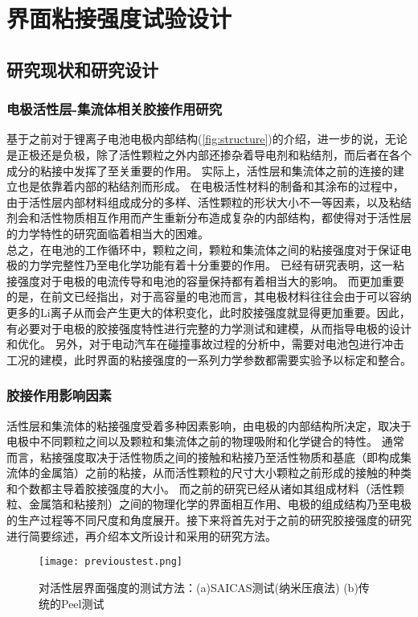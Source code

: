 \chapter{界面粘接强度试验设计}
\section{研究现状和研究设计}
\subsection{电极活性层-集流体相关胶接作用研究}
基于之前对于锂离子电池电极内部结构(\ref{fig:structure})的介绍，进一步的说，无论是正极还是负极，除了活性颗粒之外内部还掺杂着导电剂和粘结剂，而后者在各个成分的粘接中发挥了至关重要的作用。 实际上，活性层和集流体之前的连接的建立也是依靠着内部的粘结剂而形成\cite{Haselrieder2015Measuring}。
在电极活性材料的制备和其涂布的过程中，由于活性层内部材料组成成分的多样、活性颗粒的形状大小不一等因素，以及粘结剂会和活性物质相互作用\cite{Liu2012Particles}而产生重新分布造成复杂的内部结构\cite{Lee2007A,Stevenson2008The}，都使得对于活性层的力学特性的研究面临着相当大的困难\cite{Yoo2003Effect}。\\
\indent 总之，在电池的工作循环中，颗粒之间，颗粒和集流体之间的粘接强度对于保证电极的力学完整性乃至电化学功能有着十分重要的作用。 已经有研究表明，这一粘接强度对于电极的电流传导\cite{Chen2003Comparison}和电池的容量保持\cite{Lee2006Effect}都有着相当大的影响。 而更加重要的是，在前文已经指出，对于高容量的电池而言，其电极材料往往会由于可以容纳更多的Li离子从而会产生更大的体积变化，此时胶接强度就显得更加重要。因此，有必要对于电极的胶接强度特性进行完整的力学测试和建模，从而指导电极的设计和优化。 另外，对于电动汽车在碰撞事故过程的分析中，需要对电池包进行冲击工况的建模，此时界面的粘接强度的一系列力学参数都需要实验予以标定和整合。
\subsection{胶接作用影响因素}
活性层和集流体的粘接强度受着多种因素影响，由电极的内部结构所决定\cite{Seki2004Effect,Jing2008Effect}，取决于电极中不同颗粒之间以及颗粒和集流体之前的物理吸附和化学键合的特性。 通常而言，粘接强度取决于活性物质之间的接触和粘接乃至活性物质和基底（即构成集流体的金属箔）之前的粘接，从而活性颗粒的尺寸大小颗粒之前形成的接触的种类和个数都主导着胶接强度的大小\cite{Kwade}。 而之前的研究已经从诸如其组成材料\cite{Yoo2003Effect,Chen2006Binder,Liu2005Enhanced}（活性颗粒、金属箔和粘接剂）之间的物理化学的界面相互作用、电极的组成结构\cite{Buqa2006Study,Liu2012Particles,Stevenson2008The}乃至电极的生产过程\cite{Lee2007A,Jing2008Effect,Park2007Mechanical}等不同尺度和角度展开。接下来将首先对于之前的研究胶接强度的研究进行简要综述，再介绍本文所设计和采用的研究方法。
\begin{figure}
\centering   
\texttt{[image: previoustest.png]}
\caption{对活性层界面强度的测试方法：(a)SAICAS测试(纳米压痕法) (b)传统的Peel测试} 
\label{fig:pretest}
\end{figure}
